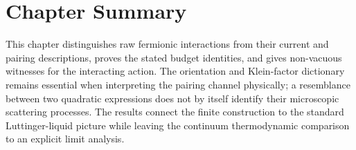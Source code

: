 \section{Chapter Summary}
This chapter distinguishes raw fermionic interactions from their current
and pairing descriptions, proves the stated budget identities, and gives
non-vacuous witnesses for the interacting action. The orientation and
Klein-factor dictionary remains essential when interpreting the pairing
channel physically; a resemblance between two quadratic expressions
does not by itself identify their microscopic scattering processes. The
results connect the finite construction to the standard Luttinger-liquid
picture while leaving the continuum thermodynamic comparison to an explicit
limit analysis.
